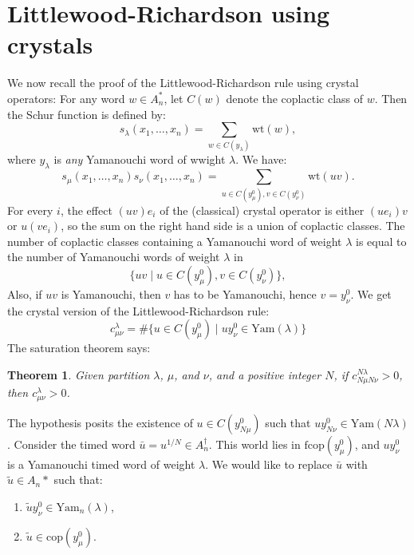 \documentclass[12pt]{amsproc}
\newcommand{\Yam}{\mathrm{Yam}}
\newcommand{\fcop}{\mathrm{fcop}}
\newcommand{\cop}{\mathrm{cop}}
\newcommand{\wt}{\mathrm{wt}}
\newtheorem{theorem}{Theorem}
\theoremstyle{definition}
\begin{document}
\section{Littlewood-Richardson using crystals}
We now recall the proof of the Littlewood-Richardson rule using crystal operators:
\label{sec:recoll-proof-littl}
For any word $w\in A_n^*$, let $C(w)$ denote the coplactic class of $w$.
Then the Schur function is defined by:
\begin{displaymath}
  s_\lambda(x_1,\dotsc,x_n) = \sum_{w\in C(y_\lambda)} \wt(w),
\end{displaymath}
where $y_\lambda$ is \emph{any} Yamanouchi word of wwight $\lambda$.
We have:
\begin{displaymath}
  s_\mu(x_1,\dotsc,x_n)s_\nu(x_1,\dotsc,x_n)=\sum_{u\in C(y^0_\mu),v\in C(y^0_\nu)} \wt(uv).
\end{displaymath}
For every $i$, the effect $(uv)e_i$ of the (classical) crystal operator is either $(ue_i)v$ or $u(ve_i)$, so the sum on the right hand side is a union of coplactic classes.
The number of coplactic classes containing a Yamanouchi word of weight $\lambda$ is equal to the number of Yamanouchi words of weight $\lambda$ in
\begin{displaymath}
  \{uv\mid u\in C(y^0_\mu),v\in C(y^0_\nu)\},
\end{displaymath}
Also, if $uv$ is Yamanouchi, then $v$ has to be Yamanouchi, hence $v=y_\nu^0$.
We get the crystal version of the Littlewood-Richardson rule:
\begin{displaymath}
  c^\lambda_{\mu\nu} = \#\{u\in C(y^0_\mu)\mid uy^0_\nu\in \Yam(\lambda)\}
\end{displaymath}
The saturation theorem says:
\begin{theorem}
  Given partition $\lambda$, $\mu$, and $\nu$, and a positive integer $N$, if $c^{N\lambda}_{N\mu N\nu}>0$, then $c^\lambda_{\mu\nu}>0$.
\end{theorem}
The hypothesis posits the existence of $u\in C(y_{N\mu}^0)$ such that $uy_{N\nu}^0\in \Yam(N\lambda)$.
Consider the timed word $\bar u=u^{1/N}\in A_n^\dagger$.
This world lies in $\fcop(y_\mu^0)$, and $uy_\nu^0$ is a Yamanouchi timed word of weight $\lambda$.
We would like to replace $\bar u$ with $\tilde u\in A_n*$ such that:
\begin{enumerate}
\item $\tilde u y^0_\nu\in \Yam_n(\lambda)$,
\item $\tilde u\in \cop(y_\mu^0)$.
\end{enumerate}
\end{document}
